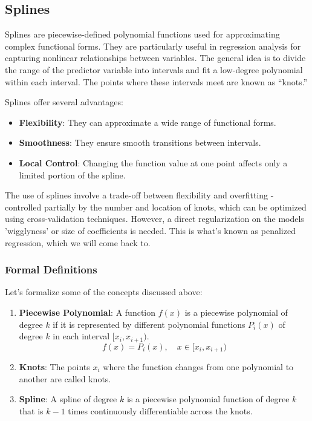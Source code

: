 \documentclass[12pt, twoside,hidelinks]{article}
\theoremstyle{definition}
\numberwithin{equation}{section}
\begin{document}
\subsection{Splines}
Splines are piecewise-defined polynomial functions used for approximating complex functional forms. They are particularly useful in regression analysis for capturing nonlinear relationships between variables. The general idea is to divide the range of the predictor variable into intervals and fit a low-degree polynomial within each interval. The points where these intervals meet are known as ``knots.''
\newline

Splines offer several advantages:

\begin{itemize}
    \item \textbf{Flexibility}: They can approximate a wide range of functional forms.
    \item \textbf{Smoothness}: They ensure smooth transitions between intervals.
    \item \textbf{Local Control}: Changing the function value at one point affects only a limited portion of the spline.
\end{itemize}

The use of splines involve a trade-off between flexibility and overfitting - controlled partially by the number and location of knots, which can be optimized using cross-validation techniques. However, a direct regularization on the models 'wigglyness' or size of coefficients is needed. This is what's known as penalized regression, which we will come back to.

\subsubsection{Formal Definitions}

Let's formalize some of the concepts discussed above:

\begin{enumerate}
    \item \textbf{Piecewise Polynomial}: A function \( f(x) \) is a piecewise polynomial of degree \( k \) if it is represented by different polynomial functions \( P_i(x) \) of degree \( k \) in each interval \( [x_{i}, x_{i+1}) \).
    \begin{equation}
         f(x) = P_i(x), \quad x \in [x_{i}, x_{i+1})
         \label{piecewise_poly_spline}
    \end{equation}
    
    \item \textbf{Knots}: The points \( x_i \) where the function changes from one polynomial to another are called knots.
    
    \item \textbf{Spline}: A spline of degree \( k \) is a piecewise polynomial function of degree \( k \) that is \( k-1 \) times continuously differentiable across the knots.
\end{enumerate}
\end{document}

